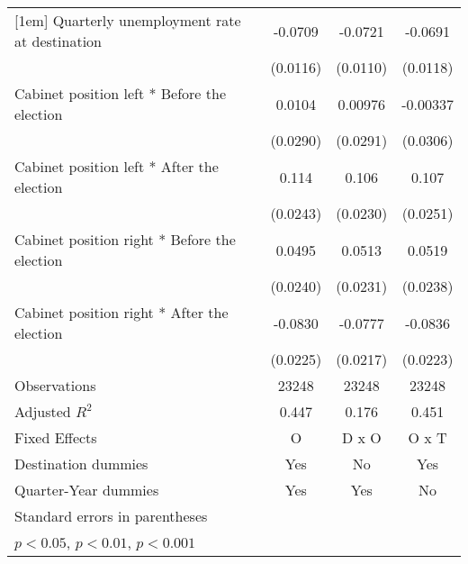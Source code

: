 \begin{table}[htbp]
\begin{tabular}{l*{3}{c}}
[1em]
Quarterly unemployment rate at destination&     -0.0709\sym{***}&     -0.0721\sym{***}&     -0.0691\sym{***}\\
                    &    (0.0116)         &    (0.0110)         &    (0.0118)         \\
[1em]
Cabinet position left * Before the election&      0.0104         &     0.00976         &    -0.00337         \\
                    &    (0.0290)         &    (0.0291)         &    (0.0306)         \\
[1em]
Cabinet position left * After the election&       0.114\sym{***}&       0.106\sym{***}&       0.107\sym{***}\\
                    &    (0.0243)         &    (0.0230)         &    (0.0251)         \\
[1em]
Cabinet position right * Before the election&      0.0495\sym{*}  &      0.0513\sym{*}  &      0.0519\sym{*}  \\
                    &    (0.0240)         &    (0.0231)         &    (0.0238)         \\
[1em]
Cabinet position right * After the election&     -0.0830\sym{***}&     -0.0777\sym{***}&     -0.0836\sym{***}\\
                    &    (0.0225)         &    (0.0217)         &    (0.0223)         \\
\hline
Observations        &       23248         &       23248         &       23248         \\
Adjusted \(R^{2}\)  &       0.447         &       0.176         &       0.451         \\
Fixed Effects       &           O         &       D x O         &       O x T         \\
Destination dummies &         Yes         &          No         &         Yes         \\
Quarter-Year dummies&         Yes         &         Yes         &          No         \\
\hline\hline
\multicolumn{4}{l}{\footnotesize Standard errors in parentheses}\\
\multicolumn{4}{l}{\footnotesize \sym{*} \(p<0.05\), \sym{**} \(p<0.01\), \sym{***} \(p<0.001\)}\\
\end{tabular}
\end{table}
